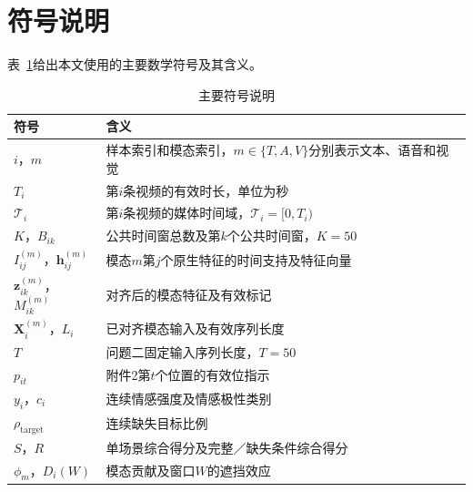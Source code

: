 \section{符号说明}\label{sec:notation}

表~\ref{tab:global_notation}给出本文使用的主要数学符号及其含义。

\begin{table}[htbp]
\centering\normalsize
\caption{主要符号说明}
\label{tab:global_notation}
\renewcommand{\arraystretch}{1.18}
\begin{tabularx}{\textwidth}{@{}p{}>{\raggedright\arraybackslash}X@{}}
\toprule
符号 & 含义\\
\midrule
$i$，$m$ & 样本索引和模态索引，$m\in\{T,A,V\}$分别表示文本、语音和视觉\\
$T_i$ & 第$i$条视频的有效时长，单位为秒\\
$\mathcal T_i$ & 第$i$条视频的媒体时间域，$\mathcal T_i=[0,T_i)$\\
$K$，$B_{ik}$ & 公共时间窗总数及第$k$个公共时间窗，$K=50$\\
$I_{ij}^{(m)}$，$\mathbf h_{ij}^{(m)}$ & 模态$m$第$j$个原生特征的时间支持及特征向量\\
$\mathbf z_{ik}^{(m)}$，$M_{ik}^{(m)}$ & 对齐后的模态特征及有效标记\\
$\mathbf X_i^{(m)}$，$L_i$ & 已对齐模态输入及有效序列长度\\
$T$ & 问题二固定输入序列长度，$T=50$\\
$p_{it}$ & 附件2第$t$个位置的有效位指示\\
$y_i$，$c_i$ & 连续情感强度及情感极性类别\\
$\rho_{\mathrm{target}}$ & 连续缺失目标比例\\
$S$，$R$ & 单场景综合得分及完整／缺失条件综合得分\\
$\phi_m$，$D_i(W)$ & 模态贡献及窗口$W$的遮挡效应\\
\bottomrule
\end{tabularx}
\end{table}
\FloatBarrier
